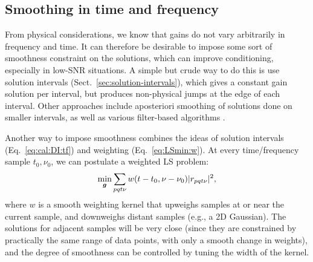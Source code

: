 \documentclass[useAMS,usenatbib]{mn2e}
\numberwithin{equation}{section}
\begin{document}
\subsection{Smoothing in time and frequency}
\label{sec:DI:smooth}

From physical considerations, we know that gains do not vary arbitrarily in frequency and time. It can
therefore be desirable to impose some sort of smoothness constraint on the solutions, which can improve conditioning, especially
in low-SNR situations. A simple but crude way to do this is use solution intervals (Sect.~\ref{sec:solution-intervals}),
which gives a constant gain solution per interval, but produces non-physical jumps at the edge of each interval.
Other approaches include aposteriori smoothing of solutions done on smaller intervals, as well as various filter-based 
algorithms \citep{tasse-filters}. 

Another way to impose smoothness combines the ideas of solution intervals  (Eq.~\ref{eq:cal:DI:tf}) 
and weighting (Eq.~\ref{eq:LSmin:w}). At every time/frequency sample $t_0,\nu_0$, we can postulate a weighted 
LS problem:
\begin{equation}
\label{eq:cal:DI:smooth}
\min_{\bmath{g}}\sum_{pqt\nu}w(t-t_0,\nu-\nu_0)|r_{pqt\nu}|^2, 
\end{equation}
where $w$ is a smooth weighting kernel that upweighs samples at or near the current sample, and downweighs distant 
samples (e.g., a 2D Gaussian). The solutions for adjacent samples will be very close (since they 
are constrained by practically the same range of data points, with only a smooth change in weights), and the 
degree of smoothness can be controlled by tuning the width of the kernel.
\end{document}

